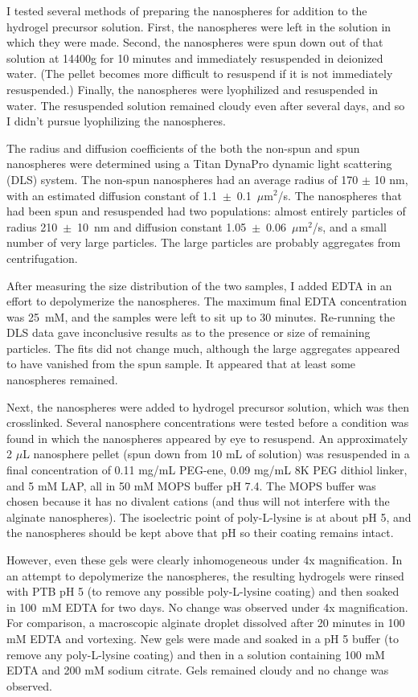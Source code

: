 I tested several methods of preparing the nanospheres for addition to the hydrogel precursor solution.  First, the nanospheres were left in the solution in which they were made.  Second, the nanospheres were spun down out of that solution at 14400g for 10 minutes and immediately resuspended in deionized water.  (The pellet becomes more difficult to resuspend if it is not immediately resuspended.) Finally, the nanospheres were lyophilized and resuspended in water.  The resuspended solution remained cloudy even after several days, and so I didn't pursue lyophilizing the nanospheres.

The radius and diffusion coefficients of the both the non-spun and spun nanospheres were determined using a Titan DynaPro dynamic light scattering (DLS) system.  The non-spun nanospheres had an average radius of 170 $\pm$ 10 nm, with an estimated diffusion constant of 1.1~$\pm$~0.1~$\mu$m$^2$/s.  The nanospheres that had been spun and resuspended had two populations: almost entirely particles of radius 210~$\pm$~10~nm and diffusion constant 1.05~$\pm$~0.06~$\mu$m$^2$/s, and a small number of very large particles.  The large particles are probably aggregates from centrifugation.

After measuring the size distribution of the two samples, I added EDTA in an effort to depolymerize the nanospheres.  The maximum final EDTA concentration was 25~mM, and the samples were left to sit up to 30 minutes.  Re-running the DLS data gave inconclusive results as to the presence or size of remaining particles.  The fits did not change much, although the large aggregates appeared to have vanished from the spun sample.  It appeared that at least some nanospheres remained.

Next, the nanospheres were added to hydrogel precursor solution, which was then crosslinked.  Several nanosphere concentrations were tested before a condition was found in which the nanospheres appeared by eye to resuspend.  An approximately 2 $\mu$L nanosphere pellet (spun down from 10 mL of solution) was resuspended in a final concentration of 0.11 mg/mL PEG-ene, 0.09 mg/mL 8K PEG dithiol linker, and 5 mM LAP, all in 50 mM MOPS buffer pH 7.4.  The MOPS buffer was chosen because it has no divalent cations (and thus will not interfere with the alginate nanospheres).  The isoelectric point of poly-L-lysine is at about pH 5, and the nanospheres should be kept above that pH so their coating remains intact.

However, even these gels were clearly inhomogeneous under 4x magnification.  In an attempt to depolymerize the nanospheres, the resulting hydrogels were rinsed with PTB pH 5 (to remove any possible poly-L-lysine coating) and then soaked in 100~mM EDTA for two days.  No change was observed under 4x magnification.  For comparison, a macroscopic alginate droplet dissolved after 20 minutes in 100 mM EDTA and vortexing.  New gels were made and soaked in a pH 5 buffer (to remove any poly-L-lysine coating) and then in a solution containing 100 mM EDTA and 200 mM sodium citrate.  Gels remained cloudy and no change was observed.

